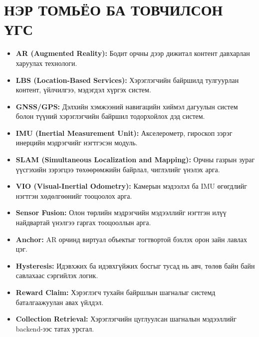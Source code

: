 \chapter*{НЭР ТОМЬЁО БА ТОВЧИЛСОН ҮГС}
\begin{sloppy}

\begin{itemize}
    \item \textbf{AR (Augmented Reality):} Бодит орчны дээр дижитал контент давхарлан харуулах технологи.
    \item \textbf{LBS (Location-Based Services):} Хэрэглэгчийн байршилд тулгуурлан контент, үйлчилгээ, мэдэгдэл хүргэх систем.
    \item \textbf{GNSS/GPS:} Дэлхийн хэмжээний навигацийн хиймэл дагуулын систем болон түүний хэрэглэгчийн байршил тодорхойлох дэд систем.
    \item \textbf{IMU (Inertial Measurement Unit):} Акселерометр, гироскоп зэрэг инерцийн мэдрэгчийг нэгтгэсэн модуль.
    \item \textbf{SLAM (Simultaneous Localization and Mapping):} Орчны газрын зураг үүсгэхийн зэрэгцээ төхөөрөмжийн байрлал, чиглэлийг үнэлэх арга.
    \item \textbf{VIO (Visual-Inertial Odometry):} Камерын мэдээлэл ба IMU өгөгдлийг нэгтгэн хөдөлгөөнийг тооцоолох арга.
    \item \textbf{Sensor Fusion:} Олон төрлийн мэдрэгчийн мэдээллийг нэгтгэн илүү найдвартай үнэлгээ гаргах тооцооллын арга.
    \item \textbf{Anchor:} AR орчинд виртуал объектыг тогтвортой бэхлэх орон зайн лавлах цэг.
    \item \textbf{Hysteresis:} Идэвхжих ба идэвхгүйжих босгыг тусад нь авч, төлөв байн байн савлахаас сэргийлэх логик.
    \item \textbf{Reward Claim:} Хэрэглэгч тухайн байршлын шагналыг системд баталгаажуулан авах үйлдэл.
    \item \textbf{Collection Retrieval:} Хэрэглэгчийн цуглуулсан шагналын мэдээллийг backend-ээс татах урсгал.
\end{itemize}

\end{sloppy}

